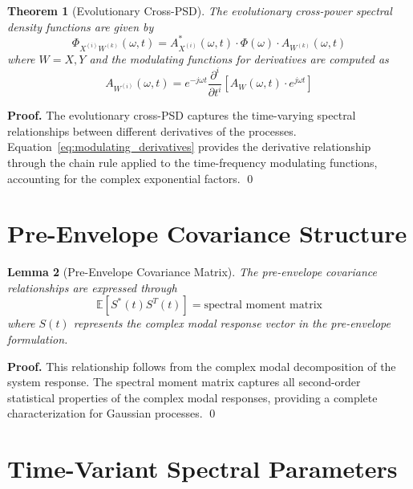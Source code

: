 \documentclass[12pt,a4paper]{article}
\newtheorem{theorem}{Theorem}[section]
\newtheorem{lemma}[theorem]{Lemma}
\renewenvironment{proof}{\noindent\textbf{Proof.}}{\qed}
\begin{document}
\begin{theorem}[Evolutionary Cross-PSD]\label{thm:cross_psd}
The evolutionary cross-power spectral density functions are given by
\begin{equation}\label{eq:cross_psd}
\Phi_{X^{(i)}W^{(k)}}(\omega, t) = A_{X^{(i)}}^*(\omega, t) \cdot \Phi(\omega) \cdot A_{W^{(k)}}(\omega, t)
\end{equation}
where $W = X, Y$ and the modulating functions for derivatives are computed as
\begin{equation}\label{eq:modulating_derivatives}
A_{W^{(i)}}(\omega, t) = e^{-j\omega t} \frac{\partial^i}{\partial t^i}[A_W(\omega, t) \cdot e^{j\omega t}]
\end{equation}
\end{theorem}

\begin{proof}
The evolutionary cross-PSD captures the time-varying spectral relationships between different derivatives of the processes. Equation~\eqref{eq:modulating_derivatives} provides the derivative relationship through the chain rule applied to the time-frequency modulating functions, accounting for the complex exponential factors.
\end{proof}

\section{Pre-Envelope Covariance Structure}

\begin{lemma}[Pre-Envelope Covariance Matrix]\label{lem:covariance_matrix}
The pre-envelope covariance relationships are expressed through
\begin{equation}\label{eq:covariance_matrix}
\mathbb{E}[S^*(t) S^T(t)] = \text{spectral moment matrix}
\end{equation}
where $S(t)$ represents the complex modal response vector in the pre-envelope formulation.
\end{lemma}

\begin{proof}
This relationship follows from the complex modal decomposition of the system response. The spectral moment matrix captures all second-order statistical properties of the complex modal responses, providing a complete characterization for Gaussian processes.
\end{proof}

\section{Time-Variant Spectral Parameters}
\end{document}
